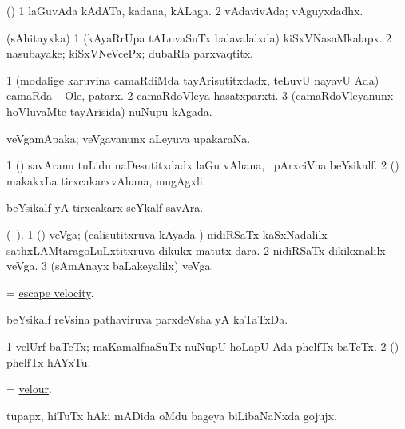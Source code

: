 \bentry
{} 
\gl{\nA}
\expl{}
\bmng
 (\pArxparx) 
\bnum
\num{1} laGuvAda kAdATa, kadana, kALaga. 
\num{2} vAdavivAda; vAguyxdadhx. 
\enum
\emng
\eentry

\bentry
{} 
\gl{\nA}
\expl{}
\bmng
 (sAhitayxka) 
\bnum
\num{1} (kAyaRrUpa tALuvaSuTx balavalalxda) kiSxVNasaMkalapx. 
\num{2} nasubayake; kiSxVNeVcePx; dubaRla parxvaqtitx. 
\enum
\emng
\eentry

\bentry
{} 
\gl{\nA}
\expl{}
\bmng
\bnum
\num{1} (modalige karuvina camaRdiMda tayArisutitxdadx, teLuvU nayavU Ada) camaRda -- Ole, patarx. 
\num{2} camaRdoVleya hasatxparxti. 
\num{3} (camaRdoVleyanunx hoVluvaMte tayArisida) nuNupu kAgada. 
\enum
\emng
\eentry

\bentry
{} 
\gl{\nA}
\expl{}
\bmng
 veVgamApaka; veVgavanunx aLeyuva upakaraNa. 
\emng
\eentry

\bentry
{} 
\gl{\nA}
\expl{}
\bmng
\bnum
\num{1} (\ca) savAranu tuLidu naDesutitxdadx laGu vAhana, \kanmu\ pArxciVna beYsikalf. 
\num{2} (\ame) makakxLa tirxcakarxvAhana, mugAgxli. 
\enum
\emng
\eentry

\bentry
{} 
\gl{\nA}
\expl{}
\bmng
 beYsikalf yA tirxcakarx seYkalf savAra. 
\emng
\eentry

\bentry
{} 
\gl{\nA}(\bava\ ). 
\bmng
\bnum
\num{1} (\Bwvi) veVga; (calisutitxruva kAyada \vi) nidiRSaTx kaSxNadalilx sathxLAMtaragoLuLxtitxruva dikukx matutx dara. 
\num{2} nidiRSaTx dikikxnalilx veVga. 
\num{3} (sAmAnayx baLakeyalilx) veVga. 
\enum
\emng

\noindent 
\gl{\pagu}
\expl{}
\bmng
  = \hyperref{kandict_e.pdf}{E}{escape velocity}{escape velocity}. 
\emng
\eentry

\bentry 
{}
\gl{\nA}
\bmng
beYsikalf reVsina pathaviruva parxdeVsha yA kaTaTxDa. 
\emng
\eentry

\bentry
{} 
\gl{\nA}
\expl{}
\bmng
\bnum
\num{1} velUrf baTeTx; maKamalfnaSuTx nuNupU hoLapU Ada phelfTx baTeTx. 
\num{2} (\pArxparx) phelfTx hAYxTu. 
\enum
\emng
\eentry

\bentry
{} 
\gl{\nA}
\expl{}
\bmng
 = \hyperlink{velour}{velour}. 
\emng
\eentry

\bentry
{} 
\gl{\nA}
\expl{}
\bmng
 tupapx, hiTuTx hAki mADida oMdu bageya biLibaNaNxda gojujx. 
\emng
\eentry

